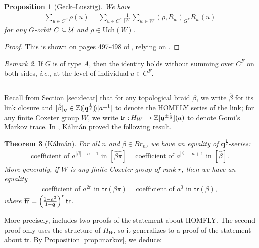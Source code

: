 \documentclass[a4paper,10pt,leqno]{amsart}
\theoremstyle{plain}
\theoremstyle{plain}
\newtheorem{thm}{Theorem}[subsection]
\theoremstyle{plain}
\newtheorem{prop}[thm]{Proposition}
\theoremstyle{definition}
\theoremstyle{remark}
\newtheorem{rem}[thm]{Remark}
\newcommand{\Br}{\mathit{Br}}
\newcommand{\Q}{\bm{q}}
\newcommand{\UCh}{\mathrm{Uch}}
\begin{document}
\begin{prop}[Geck--Lusztig]
We have
\begin{align}
\sum_{u \in C^F} \rho(u) = 
\sum_{u \in C^F}
\frac{1}{|W|}
\sum_{w \in W}
{(\rho, R_w)_{G^F}}
R_w(u)
\end{align}
for any $G$-orbit $C \subseteq \cal{U}$ and $\rho \in \UCh(W)$.
\end{prop}

\begin{proof}
This is shown on pages 497-498 of \cite{lusztig_2011}, relying on \cite[Prop.\ 1.3]{geck_1996}.
\end{proof}

\begin{rem}
If $G$ is of type $A$, then the identity holds without summing over $C^F$ on both sides, \emph{i.e.}, at the level of individual $u \in C^F$.
\end{rem}

\subsection{}

Recall from Section \ref{sec:decat} that for any topological braid $\beta$, we write $\hat{\beta}$ for its link closure and $[\hat{\beta}]_{\Q} \in \bb{Z}(\!(\Q^{\frac{1}{2}})\!)[a^{\pm 1}]$ to denote the HOMFLY series of the link; for any finite Coxeter group $W$, we write $\mathsf{tr} : H_W \to \bb{Z}[\Q^{\pm\frac{1}{2}}](a)$ to denote Gomi's Markov trace.
In \cite{kalman}, K\'alm\'an proved the following result.

\begin{thm}[K\'alm\'an]
For all $n$ and $\beta \in \Br_n$, we have an equality of $\Q^{\frac{1}{2}}$-series:
\begin{align}
\text{coefficient of $a^{|\beta| + n - 1}$ in $[\widehat{\beta\pi}]$}
=
\text{coefficient of $a^{|\beta| - n + 1}$ in $[\hat{\beta}]$}.
\end{align}
More generally, if $W$ is any finite Coxeter group of rank $r$, then we have an equality
\begin{align}
\text{coefficient of $a^{2r}$ in $\overline{\mathsf{tr}}(\beta \pi)$}
=
\text{coefficient of $a^0$ in $\overline{\mathsf{tr}}(\beta)$},
\end{align}
where $\overline{\mathsf{tr}} = \pa{\frac{1 - a^2}{1 - \Q}}^r\mathsf{tr}$.
\end{thm}

More precisely, \cite{kalman} includes two proofs of the statement about HOMFLY.
The second proof only uses the structure of $H_W$, so it generalizes to a proof of the statement about $\mathsf{tr}$.
By Proposition \ref{prop:markov}, we deduce:
\end{document}
